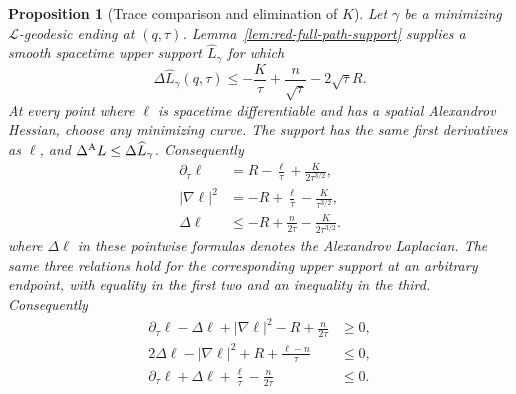 \documentclass[10pt]{coll-l}
\newtheorem{proposition}[theorem]{Proposition}
\theoremstyle{definition}
\theoremstyle{remark}
\numberwithin{section}{chapter}
\numberwithin{equation}{chapter}
\begin{document}
\begin{proposition}[Trace comparison and elimination of $K$]
\label{prop:red-trace-comparison}
Let $\gamma$ be a minimizing $\mathcal L$-geodesic ending at
$(q,\tau)$.  Lemma~\ref{lem:red-full-path-support} supplies a smooth
spacetime upper support $\widehat L_\gamma$ for which
\begin{equation}
 \Delta\widehat L_\gamma(q,\tau)
       \leq-\frac K\tau+\frac n{\sqrt\tau}
                    -2\sqrt\tau R.                     \label{eq:red-L-Laplacian}
\end{equation}
At every point where $\ell$ is spacetime differentiable and has a spatial
Alexandrov Hessian, choose any minimizing curve.  The support has the same
first derivatives as $\ell$, and
$\Delta^{\rm A}L\leq\Delta\widehat L_\gamma$.  Consequently
\begin{align}
 \partial_\tau\ell
   &=R-\frac\ell\tau+\frac K{2\tau^{3/2}},              \label{eq:red-ell-time-K}\\
 |\nabla\ell|^2
   &=-R+\frac\ell\tau-\frac K{\tau^{3/2}},             \label{eq:red-ell-gradient-K}\\
 \Delta\ell
   &\leq-R+\frac n{2\tau}-\frac K{2\tau^{3/2}}.        \label{eq:red-ell-Laplacian-K}
\end{align}
where $\Delta\ell$ in these pointwise formulas denotes the Alexandrov
Laplacian.  The same three relations hold for the corresponding upper
support at an arbitrary endpoint, with equality in the first two and an
inequality in the third.
Consequently
\begin{align}
 \partial_\tau\ell-\Delta\ell+|\nabla\ell|^2-R
       +\frac n{2\tau}&\geq0,                           \label{eq:red-ell-main-inequality}\\
 2\Delta\ell-|\nabla\ell|^2+R+\frac{\ell-n}{\tau}
       &\leq0,                                           \label{eq:red-ell-second-inequality}\\
 \partial_\tau\ell+\Delta\ell+\frac\ell\tau
       -\frac n{2\tau}&\leq0.                          \label{eq:red-ell-sum-inequality}
\end{align}
\end{proposition}
\end{document}
